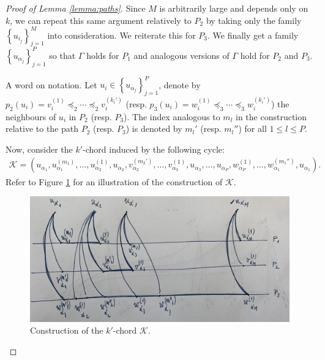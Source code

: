 \documentclass[12pt]{article}
\theoremstyle{definition}
\begin{document}
\begin{proof}[Proof of Lemma \ref{lemma:paths}]
        Since $M$ is arbitrarily large and depends only
        on $k$, we can repeat this same argument
        relatively to $P_2$ by taking only
        the family $\left\{u_{i_{j}}\right\}_{j = 1}^{M}$ 
        into consideration.
        We reiterate this for $P_3$.
        We finally get a family
        $\left\{u_{\alpha_{j}}\right\}_{j = 1}^{P}$
        so that $\Gamma$ holds
        for $P_1$ and analogous versions
        of $\Gamma$ hold for $P_2$ and
        $P_3$.

        A word on notation. Let $u_{i} \in \left\{u_{\alpha_{j}}\right\}
        _{j=1}^{P}$, denote by
        $p_2\left(u_{i}\right) = v_{i}^{\left(1\right)}
        \preceq_2 \cdots \preceq_2 v_{i}^{\left(k_{i}'\right)}$ 
        (resp. $p_3\left(u_{i}\right) = 
        w_{i}^{\left(1\right)} \preceq_3
        \cdots \preceq_3 w_{i}^{\left(k_{i}'\right)}$)
        the neighbours of $u_{i}$ in $P_2$ 
        (resp. $P_3$). 
        The index analogous to $m_{l}$
        in the construction relative to the
        path $P_2$ (resp. $P_3$) is denoted by
        $m_{l}'$ (resp. $m_{l}''$) for all
        $1 \leq l \leq P$.

        Now, consider the $k'$-chord induced by 
        the following cycle:
        \begin{gather*}
            \mathcal{K} = \left(u_{\alpha_1}, u_{\alpha_1}^{\left(m_1\right)},
            \ldots,
            u_{\alpha_2}^{\left(1\right)},
            u_{\alpha_2},
            v_{\alpha_2}^{\left(m_2'\right)},
            \ldots,
            v_{\alpha_3}^{\left(1\right)},
            u_{\alpha_3}, \ldots,
            u_{\alpha_{P}},
            w_{\alpha_{P}}^{\left(1\right)},
            \ldots,
            w_{\alpha_1}^{\left(m_1''\right)},
            u_{\alpha_1}\right).
        \end{gather*}
        Refer to Figure \ref{fig:kchord} for
        an illustration of the construction of $\mathcal{K}$.
        \begin{figure}[ht]
            \centering
            \includegraphics[width=0.75\linewidth]{figures/kchord.jpg}
            \caption{Construction of the $k'$-chord $\mathcal{K}$.}
            \label{fig:kchord}
        \end{figure}


\end{proof}
\end{document}
